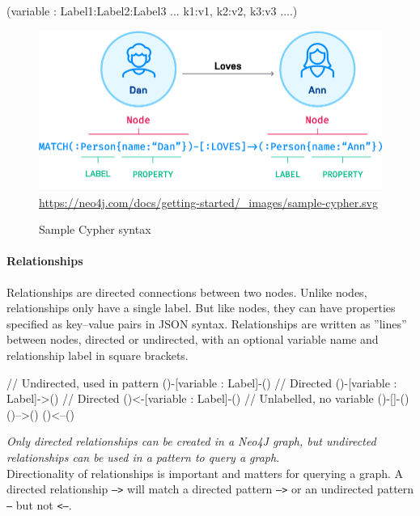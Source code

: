 \begin{cyphercode}
(variable : Label1:Label2:Label3 ... {k1:v1, k2:v2, k3:v3 ....})
\end{cyphercode}


\begin{figure}
\centering
\includegraphics[width=.75\textwidth]{sample-cypher.png}
\scriptsize{\url{https://neo4j.com/docs/getting-started/_images/sample-cypher.svg}}
\caption{Sample Cypher syntax}
\label{fig:sample-cypher}
\end{figure}

\paragraph*{Relationships} Relationships are directed connections between two nodes. Unlike nodes, relationships only have a single label. But like nodes, they can have properties specified as key--value pairs in JSON syntax. Relationships are written as ''lines'' between nodes, directed or undirected, with an optional variable name and relationship label in square brackets. 

\begin{samepage}
\begin{cyphercode}
// Undirected, used in pattern
()-[variable : Label]-()  
// Directed 
()-[variable : Label]->() 
// Directed
()<-[variable : Label]-() 
// Unlabelled, no variable
()-[]-()    
()-->()
()<--()
\end{cyphercode}
\end{samepage}

\begin{tcolorbox}[colback=alert]
\emph{Only directed relationships can be created in a Neo4J graph, but undirected relationships can be used in a pattern to query a graph}. \\

Directionality of relationships is important and matters for querying a graph. A directed relationship \texttt{-->} will match a directed pattern \texttt{-->} or an undirected pattern \texttt{--} but not \texttt{<--}. 
\end{tcolorbox}

